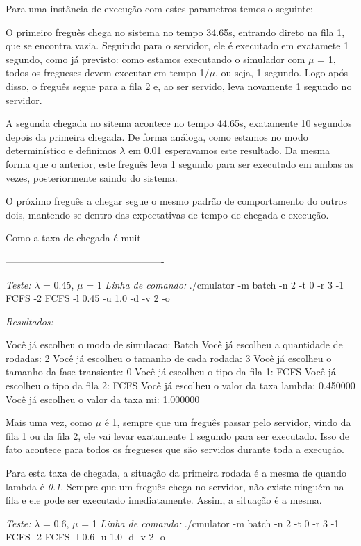\documentclass[a4paper,10pt]{article}
\begin{document}
Para uma instância de execução com estes parametros temos o seguinte:

O primeiro freguês chega no sistema no tempo 34.65s, entrando direto na fila 1, que se encontra vazia. Seguindo para o servidor, ele é executado em exatamete 1 segundo, como já previsto: como estamos executando o simulador com $\mu$ = 1, todos os fregueses devem executar em tempo 1/$\mu$, ou seja, 1 segundo. Logo após disso, o freguês segue para a fila 2 e, ao ser servido, leva novamente 1 segundo no servidor. 

A segunda chegada no sitema acontece no tempo 44.65s, exatamente 10 segundos depois da primeira chegada. De forma análoga, como estamos no modo determinístico e definimos $\lambda$ em 0.01 esperavamos este resultado. Da mesma forma que o anterior, este freguês leva 1 segundo para ser executado em ambas as vezes, posteriormente saindo do sistema.

O próximo freguês a chegar segue o mesmo padrão de comportamento do outros dois, mantendo-se dentro das expectativas de tempo de chegada e execução.

Como a taxa de chegada é muit

-------------------------------------------------

\emph{Teste:} $\lambda$ = 0.45, $\mu$ = 1
\emph{Linha de comando:}
     ./cmulator -m batch -n 2 -t 0 -r 3 -1 FCFS -2 FCFS -l 0.45 -u 1.0 -d -v 2 -o

\emph{Resultados:}

Você já escolheu o modo de simulacao: Batch
Você já escolheu a quantidade de rodadas: 2
Você já escolheu o tamanho de cada rodada: 3
Você já escolheu o tamanho da fase transiente: 0
Você já escolheu o tipo da fila 1: FCFS
Você já escolheu o tipo da fila 2: FCFS
Você já escolheu o valor da taxa lambda: 0.450000
Você já escolheu o valor da taxa mi: 1.000000

    Mais uma vez, como $\mu$ é 1, sempre que um freguês passar pelo servidor, vindo da fila 1 ou da fila 2, ele vai levar exatamente 1 segundo para ser executado. Isso de fato acontece para todos os fregueses que são servidos durante toda a execução.

    Para esta taxa de chegada, a situação da primeira rodada é a mesma de quando lambda é \emph{0.1}. Sempre que um freguês chega no servidor, não existe ninguém na fila e ele pode ser executado imediatamente. Assim, a situação é a mesma.


\emph{Teste:} $\lambda$ = 0.6, $\mu$ = 1
\emph{Linha de comando:}
     ./cmulator -m batch -n 2 -t 0 -r 3 -1 FCFS -2 FCFS -l 0.6 -u 1.0 -d -v 2 -o
\end{document}
